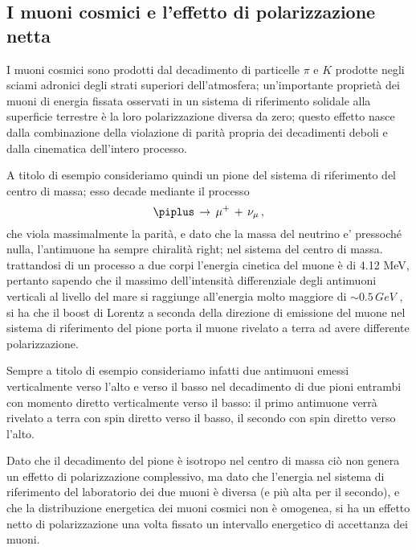 \subsection{I muoni cosmici e l'effetto di polarizzazione netta}
I muoni cosmici sono prodotti dal decadimento di particelle $\pi$ e $K$ prodotte negli sciami adronici degli strati superiori dell'atmosfera; un'importante proprietà dei muoni di energia fissata osservati in un sistema di riferimento solidale alla superficie terrestre è la loro polarizzazione diversa da zero; questo effetto nasce dalla combinazione della violazione di parità propria dei decadimenti deboli e dalla cinematica dell'intero processo. \par
A titolo di esempio consideriamo quindi un pione del sistema di riferimento del centro di massa; esso decade mediante il processo
\begin{equation}
	\piplus \, \to \, \mu^+ \, + \, \nu_{\mu} \, ,
	\label{eq:pi_decay}
\end{equation}
che viola massimalmente la parità, e dato che la massa del neutrino e' pressoch\'e nulla, l'antimuone ha sempre chiralità right; nel sistema del centro di massa. trattandosi di un processo a due corpi l'energia cinetica del muone è di 4.12 MeV, pertanto sapendo che il massimo dell'intensità differenziale degli antimuoni verticali al livello del mare si raggiunge all'energia molto maggiore di $\sim 0.5 \, GeV$  \cite{bib:AJP-Amsler}, si ha che il boost di Lorentz a seconda della direzione di emissione del muone nel sistema di riferimento del pione porta il muone rivelato a terra ad avere differente polarizzazione. \par
Sempre a titolo di esempio consideriamo infatti due antimuoni emessi verticalmente verso l'alto e verso il basso nel decadimento di due pioni entrambi con momento diretto verticalmente verso il basso:
il primo antimuone verrà rivelato a terra con spin diretto verso il basso, il secondo con spin diretto verso l'alto. \par
Dato che il decadimento del pione è isotropo nel centro di massa ciò non genera un effetto di polarizzazione complessivo, ma dato che l'energia nel sistema di riferimento del laboratorio dei due muoni è diversa (e più alta per il secondo), e che la distribuzione energetica dei muoni cosmici non è omogenea, si ha un effetto netto di polarizzazione una volta fissato un intervallo energetico di accettanza dei muoni. \cite{bib:Lipari:1993hd} \par

 \par

